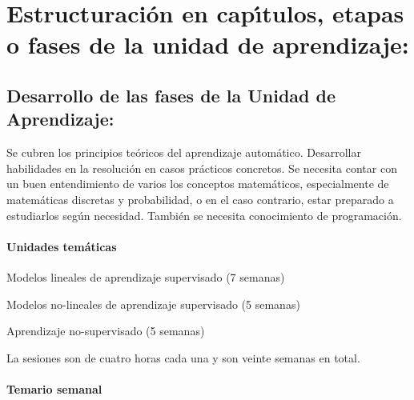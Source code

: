 \section{Estructuraci\'{o}n en cap\'{\i}tulos, etapas o fases de la unidad de
  aprendizaje:}

\subsection{Desarrollo de las fases de la Unidad de Aprendizaje:}

\quad

Se cubren los principios te\'{o}ricos del aprendizaje
autom\'{a}tico. Desarrollar habilidades en la resoluci\'{o}n en casos
pr\'{a}cticos concretos. Se necesita contar con un buen entendimiento
de varios los conceptos matem\'{a}ticos, especialmente de
matem\'{a}ticas discretas y probabilidad, o en el caso contrario,
estar preparado a estudiarlos seg\'{u}n necesidad. Tambi\'{e}n se
necesita conocimiento de programaci\'{o}n.

\paragraph{Unidades tem\'{a}ticas}

\begin{description}[itemsep=-3pt]
\item[U1]{Modelos lineales de aprendizaje supervisado (7 semanas)}
\item[U2]{Modelos no-lineales de aprendizaje supervisado (5 semanas)}
\item[U3]{Aprendizaje no-supervisado (5 semanas)}  
\end{description}

La sesiones son de cuatro horas cada una y son veinte semanas en
total.

\paragraph{Temario semanal}

